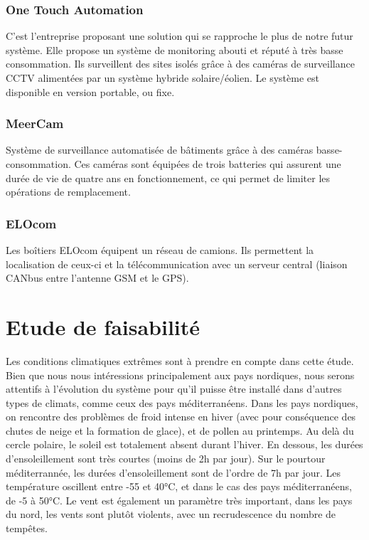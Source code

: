\subsubsection{One Touch Automation}

C’est l’entreprise proposant une solution qui se rapproche le plus de notre futur système.
Elle propose un système de monitoring abouti et réputé à très basse consommation. Ils surveillent des sites isolés grâce à des caméras de surveillance CCTV alimentées par un système hybride solaire/éolien. Le système est disponible en version portable, ou fixe.

\subsubsection{MeerCam}

Système de surveillance automatisée de bâtiments grâce à des caméras basse-consommation. Ces caméras sont équipées de trois batteries qui assurent une durée de vie de quatre ans en fonctionnement, ce qui permet de limiter les opérations de remplacement.

\subsubsection{ELOcom}

Les boîtiers ELOcom équipent un réseau de camions. Ils permettent la localisation de ceux-ci et la télécommunication avec un serveur central (liaison CANbus entre l’antenne GSM et le GPS).

\section{Etude de faisabilité}

Les conditions climatiques extrêmes sont à prendre en compte dans cette étude. Bien que nous nous intéressions principalement aux pays nordiques, nous serons attentifs à l’évolution du système pour qu’il puisse être installé dans d'autres types de climats, comme ceux des pays méditerranéens.
Dans les pays nordiques, on rencontre des problèmes de froid intense en hiver (avec pour conséquence des chutes de neige et la formation de glace), et de pollen au printemps. Au delà du cercle polaire, le soleil est totalement absent durant l'hiver. En dessous, les durées d'ensoleillement sont très courtes (moins de 2h par jour). Sur le pourtour méditerrannée, les durées d'ensoleillement sont de l'ordre de 7h par jour.
Les température oscillent entre -55 et 40°C, et dans le cas des pays méditerranéens, de -5 à 50°C.
Le vent est également un paramètre très important, dans les pays du nord, les vents sont plutôt violents, avec un recrudescence du nombre de tempêtes.

